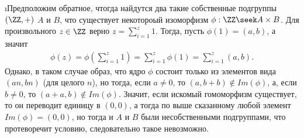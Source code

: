 \i Предположим обратное, чтогда найдутся два такие собственные подгруппы $(\ZZ, +)$ $A$ и $B$, что существует некотороый изоморфизм $\phi: \ZZ \seek A \times B$. Для произвольного $z \in \ZZ$ верно $z = \sum_{i=1}^{z} 1$. Тогда, пусть $\phi(1) = (a, b)$, а значит
\begin{gather*}
    \phi(z) = \phi(\sum_{i=1}^{z} 1) = \sum_{i=1}^{z}\phi(1) = \sum_{i=1}^{z} (a, b).
\end{gather*}
Однако, в таком случае образ, что ядро $\phi$ состоит только из элементов вида $(an, bn)$ (для целого $n$), но тогда, если $a \ne 0$, то $(a, b + b) \not\in Im(\phi)$, а, если $b \ne 0$, то $(a + a, b) \not\in Im(\phi)$. Значит, если искомый гомоморфизм существует, то он переводит единицу в $(0, 0)$, а тогда по выше сказанному любой элемент $Im(\phi) = (0, 0)$, но тогда и $A$ и $B$ были несобственными подгруппами, что протеворечит условию, следовательно такое невозможно.